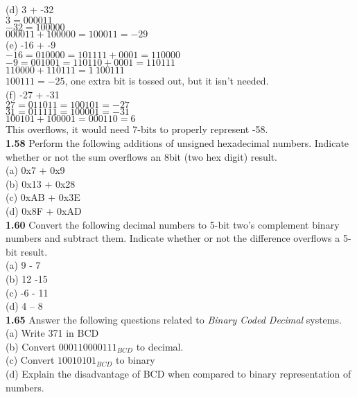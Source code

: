 \documentclass[12pt,a4paper]{report}
\begin{document}
\begin{normalsize}
(d) 3 + -32 \\
$ 3 = 000011 $ \\
$ -32 = 100000 $ \\
$ 000011 + 100000 = 100011 = -29 $ \\

(e) -16 + -9 \\
$ -16 = 010000 = 101111 + 0001 = 110000 $ \\
$ -9 = 001001 = 110110 + 0001 = 110111 $ \\
$ 110000 + 110111 = 1\: 100111 $ \\
$ 100111 = -25 $, one extra bit is tossed out, but it isn't needed. \\

(f) -27 + -31 \\
$ 27 = 011011 = 100101 = -27 $ \\
$ 31 = 011111 = 100001 = -31 $ \\ 
$ 100101 + 100001 = 000110 = 6 $ \\
This overflows, it would need 7-bits to properly represent -58. \\

\textbf{1.58} Perform the following additions of unsigned hexadecimal numbers. Indicate whether or not the sum overflows an 8bit (two hex digit) result. \\
(a) 0x7 + 0x9 \\
(b) 0x13 + 0x28 \\
(c) 0xAB + 0x3E \\
(d) 0x8F + 0xAD \\


\textbf{1.60} Convert the following decimal numbers to 5-bit two's complement binary numbers and subtract them. Indicate whether or not the difference overflows a 5-bit result. \\
(a) 9 - 7 \\
(b) 12 -15 \\
(c) -6 - 11 \\
(d) 4 -- 8 \\

\textbf{1.65} Answer the following questions related to \textit{Binary Coded Decimal} systems. \\
(a) Write 371 in BCD \\
(b) Convert $ 000110000111_{BCD} $ to decimal. \\
(c) Convert $ 10010101_{BCD} $ to binary \\
(d) Explain the disadvantage of BCD when compared to binary representation of numbers. \\




\end{normalsize}
\end{document}
